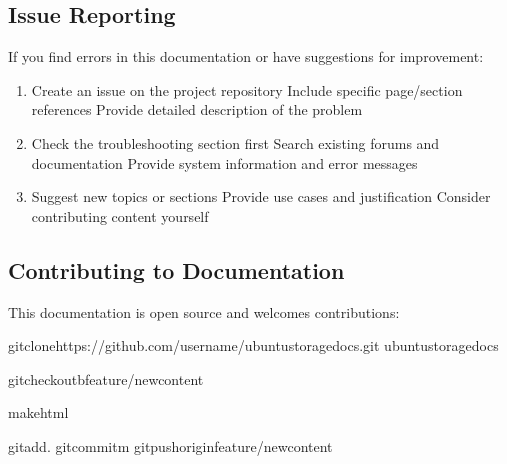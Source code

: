 \documentclass[letterpaper,10pt,english]{sphinxmanual}
\begin{document}
\subsection{Issue Reporting}
\label{\detokenize{downloads:issue-reporting}}
\sphinxAtStartPar
If you find errors in this documentation or have suggestions for improvement:
\begin{enumerate}
%
\item {} 
\sphinxAtStartPar
{}
\sphinxhyphen{} Create an issue on the project repository
\sphinxhyphen{} Include specific page/section references
\sphinxhyphen{} Provide detailed description of the problem

\item {} 
\sphinxAtStartPar
{}
\sphinxhyphen{} Check the troubleshooting section first
\sphinxhyphen{} Search existing forums and documentation
\sphinxhyphen{} Provide system information and error messages

\item {} 
\sphinxAtStartPar
{}
\sphinxhyphen{} Suggest new topics or sections
\sphinxhyphen{} Provide use cases and justification
\sphinxhyphen{} Consider contributing content yourself

\end{enumerate}


\subsection{Contributing to Documentation}
\label{\detokenize{downloads:contributing-to-documentation}}
\sphinxAtStartPar
This documentation is open source and welcomes contributions:

\begin{sphinxVerbatim}[commandchars=\\\{\}]
gitclonehttps://github.com/username/ubuntu\PYGZhy{}storage\PYGZhy{}docs.git
ubuntu\PYGZhy{}storage\PYGZhy{}docs

gitcheckout\PYGZhy{}bfeature/new\PYGZhy{}content


makehtml

gitadd.
gitcommit\PYGZhy{}m
gitpushoriginfeature/new\PYGZhy{}content

\end{sphinxVerbatim}
\end{document}
